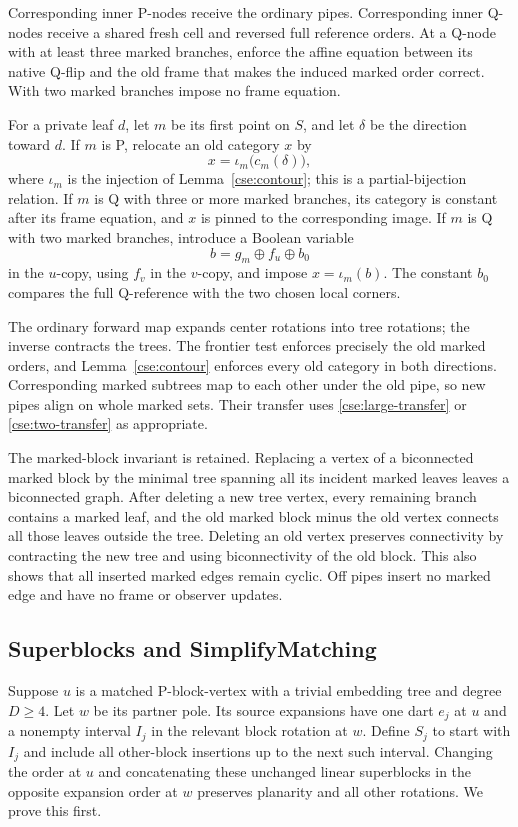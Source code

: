 Corresponding inner P-nodes receive the ordinary pipes. Corresponding
inner Q-nodes receive a shared fresh cell and reversed full reference
orders. At a Q-node with at least three marked branches, enforce the
affine equation between its native Q-flip and the old frame that makes
the induced marked order correct. With two marked branches impose no
frame equation.

For a private leaf $d$, let $m$ be its first point on $S$, and let
$\delta$ be the direction toward $d$. If $m$ is P, relocate an old
category $x$ by
\[
 x=\iota_m\bigl(c_m(\delta)\bigr),
\]
where $\iota_m$ is the injection of Lemma~\ref{cse:contour}; this is a
partial-bijection relation. If $m$ is Q with three or more marked
branches, its category is constant after its frame equation, and $x$ is
pinned to the corresponding image. If $m$ is Q with two marked branches,
introduce a Boolean variable
\[
 b=g_m\oplus f_u\oplus b_0
\]
in the $u$-copy, using $f_v$ in the $v$-copy, and impose
$x=\iota_m(b)$. The constant $b_0$ compares the full Q-reference with
the two chosen local corners.

The ordinary forward map expands center rotations into tree rotations;
the inverse contracts the trees. The frontier test enforces precisely the
old marked orders, and Lemma~\ref{cse:contour} enforces every old category
in both directions. Corresponding marked subtrees map to each other under
the old pipe, so new pipes align on whole marked sets. Their transfer
uses \eqref{cse:large-transfer} or \eqref{cse:two-transfer} as appropriate.

The marked-block invariant is retained. Replacing a vertex of a
biconnected marked block by the minimal tree spanning all its incident
marked leaves leaves a biconnected graph. After deleting a new tree
vertex, every remaining branch contains a marked leaf, and the old
marked block minus the old vertex connects all those leaves outside the
tree. Deleting an old vertex preserves connectivity by contracting the
new tree and using biconnectivity of the old block. This also shows that
all inserted marked edges remain cyclic. Off pipes insert no marked
edge and have no frame or observer updates.

\subsection{Superblocks and SimplifyMatching}

Suppose $u$ is a matched P-block-vertex with a trivial embedding tree and
degree $D\ge4$. Let $w$ be its partner pole. Its source expansions have
one dart $e_j$ at $u$ and a nonempty interval $I_j$ in the relevant block
rotation at $w$. Define $S_j$ to start with $I_j$ and include all
other-block insertions up to the next such interval. Changing the order
at $u$ and concatenating these unchanged linear superblocks in the
opposite expansion order at $w$ preserves planarity and all other
rotations. We prove this first.

